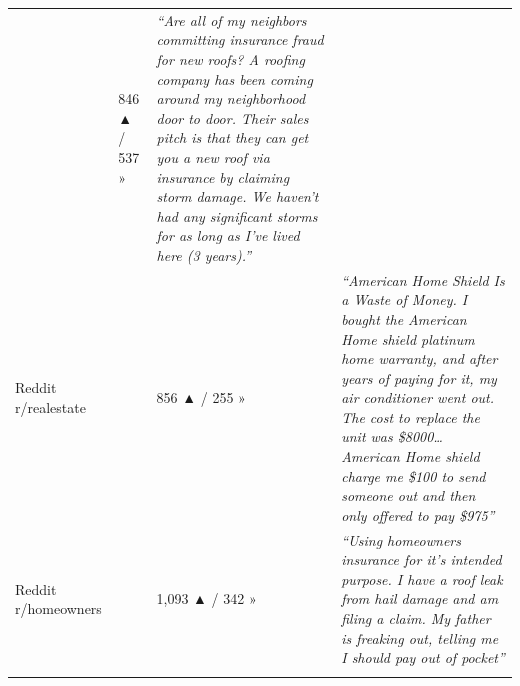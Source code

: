 \documentclass[
  10pt,
]{article}
\let\origtexttt\texttt
\renewcommand{\texttt}[1]{\origtexttt{\seqsplit{#1}}}
\begin{document}
\begin{longtable}[]{@{}llll@{}}
\begin{minipage}[t]{0.14\columnwidth}
\texttt{1o6g2ip}\strut
\end{minipage} & \begin{minipage}[t]{0.10\columnwidth}\raggedright
846 ▲ / 537 »\strut
\end{minipage} & \begin{minipage}[t]{0.44\columnwidth}\raggedright
\emph{``Are all of my neighbors committing insurance fraud for new roofs? A roofing company has been
coming around my neighborhood door to door. Their sales pitch is that they can get you a new roof
via insurance by claiming storm damage. We haven't had any significant storms for as long as I've
lived here (3 years).''}\strut
\end{minipage}\tabularnewline
\begin{minipage}[t]{0.20\columnwidth}\raggedright
Reddit r/realestate\strut
\end{minipage} & \begin{minipage}[t]{0.14\columnwidth}\raggedright
\texttt{1nfo8zr}\strut
\end{minipage} & \begin{minipage}[t]{0.10\columnwidth}\raggedright
856 ▲ / 255 »\strut
\end{minipage} & \begin{minipage}[t]{0.44\columnwidth}\raggedright
\emph{``American Home Shield Is a Waste of Money. I bought the American Home shield platinum home
warranty, and after years of paying for it, my air conditioner went out. The cost to replace the
unit was \$8000\ldots{} American Home shield charge me \$100 to send someone out and then only
offered to pay \$975''}\strut
\end{minipage}\tabularnewline
\begin{minipage}[t]{0.20\columnwidth}\raggedright
Reddit r/homeowners\strut
\end{minipage} & \begin{minipage}[t]{0.14\columnwidth}\raggedright
\texttt{1kk7fb6}\strut
\end{minipage} & \begin{minipage}[t]{0.10\columnwidth}\raggedright
1,093 ▲ / 342 »\strut
\end{minipage} & \begin{minipage}[t]{0.44\columnwidth}\raggedright
\emph{``Using homeowners insurance for it's intended purpose. I have a roof leak from hail damage
and am filing a claim. My father is freaking out, telling me I should pay out of pocket''}\strut
\end{minipage}\tabularnewline
\begin{minipage}[t]{0.20\columnwidth}\raggedright

\end{minipage}
\end{longtable}
\end{document}
